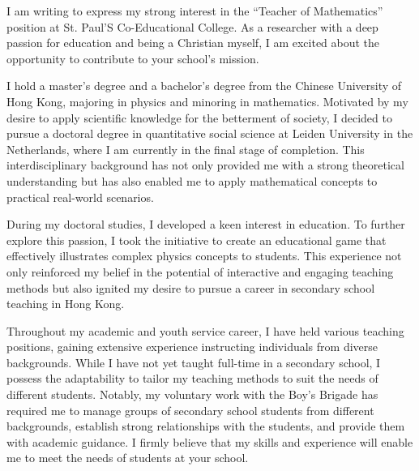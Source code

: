 \documentclass[11pt, a4paper]{awesome-cv}
\begin{document}
\makecvheader[R]

\makecvfooter
  {}%
  {}%
  {}

\makelettertitle

\begin{cvletter}

I am writing to express my strong interest in the ``Teacher of Mathematics'' position at St. Paul'S Co-Educational College. As a researcher with a deep passion for education and being a Christian myself, I am excited about the opportunity to contribute to your school's mission.

I hold a master's degree and a bachelor's degree from the Chinese University of Hong Kong, majoring in physics and minoring in mathematics. Motivated by my desire to apply scientific knowledge for the betterment of society, I decided to pursue a doctoral degree in quantitative social science at Leiden University in the Netherlands, where I am currently in the final stage of completion. This interdisciplinary background has not only provided me with a strong theoretical understanding but has also enabled me to apply mathematical concepts to practical real-world scenarios.

During my doctoral studies, I developed a keen interest in education. To further explore this passion, I took the initiative to create an educational game that effectively illustrates complex physics concepts to students. This experience not only reinforced my belief in the potential of interactive and engaging teaching methods but also ignited my desire to pursue a career in secondary school teaching in Hong Kong. 

Throughout my academic and youth service career, I have held various teaching positions, gaining extensive experience instructing individuals from diverse backgrounds. While I have not yet taught full-time in a secondary school, I possess the adaptability to tailor my teaching methods to suit the needs of different students. Notably, my voluntary work with the Boy's Brigade has required me to manage groups of secondary school students from different backgrounds, establish strong relationships with the students, and provide them with academic guidance. I firmly believe that my skills and experience will enable me to meet the needs of students at your school.


\end{cvletter}
\end{document}
